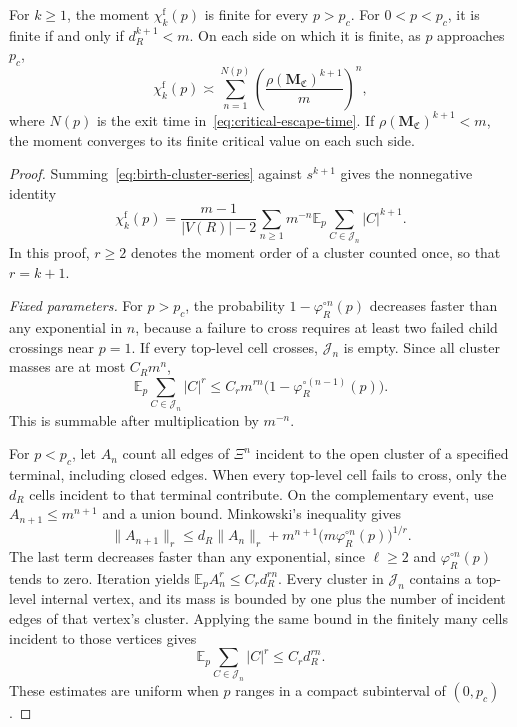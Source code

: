\begin{proposition}\label{prop:annealed-moments}
For $k\ge1$, the moment $\chi_k^{\mathrm f}(p)$ is finite for every $p>p_c$.
For $0<p<p_c$, it is finite if and only if $d_R^{k+1}<m$.
On each side on which it is finite, as $p$ approaches $p_c$,
\begin{equation}\label{eq:near-critical-moment-sum}
 \chi_k^{\mathrm f}(p)\asymp
 \sum_{n=1}^{N(p)}
 \left(\frac{\rho(\mathbf M_{\mathfrak C})^{k+1}}m\right)^n,
\end{equation}
where $N(p)$ is the exit time in~\eqref{eq:critical-escape-time}.
If $\rho(\mathbf M_{\mathfrak C})^{k+1}<m$, the moment converges to its finite critical value on each such side.
\end{proposition}
\begin{proof}
Summing~\eqref{eq:birth-cluster-series} against $s^{k+1}$ gives the nonnegative identity
\begin{equation}\label{eq:birth-moment-series}
 \chi_k^{\mathrm f}(p)=\frac{m-1}{|V(R)|-2}
 \sum_{n\ge1}m^{-n}\mathbb E_p
 \sum_{C\in\mathcal J_n}|C|^{k+1}.
\end{equation}
In this proof, $r\ge2$ denotes the moment order of a cluster counted once, so that $r=k+1$.

\emph{Fixed parameters.}
For $p>p_c$, the probability $1-\varphi_R^{\circ n}(p)$ decreases faster than any exponential in $n$, because a failure to cross requires at least two failed child crossings near $p=1$.
If every top-level cell crosses, $\mathcal J_n$ is empty.
Since all cluster masses are at most $C_Rm^n$,
\[
 \mathbb E_p\sum_{C\in\mathcal J_n}|C|^r
 \le C_rm^{rn}\bigl(1-\varphi_R^{\circ(n-1)}(p)\bigr).
\]
This is summable after multiplication by $m^{-n}$.

For $p<p_c$, let $A_n$ count all edges of $\Xi^n$ incident to the open cluster of a specified terminal, including closed edges.
When every top-level cell fails to cross, only the $d_R$ cells incident to that terminal contribute.
On the complementary event, use $A_{n+1}\le m^{n+1}$ and a union bound.
Minkowski's inequality gives
\[
 \|A_{n+1}\|_r\le d_R\|A_n\|_r
 +m^{n+1}\bigl(m\varphi_R^{\circ n}(p)\bigr)^{1/r}.
\]
The last term decreases faster than any exponential, since $\ell\ge2$ and $\varphi_R^{\circ n}(p)$ tends to zero.
Iteration yields $\mathbb E_p A_n^r\le C_rd_R^{rn}$.
Every cluster in $\mathcal J_n$ contains a top-level internal vertex, and its mass is bounded by one plus the number of incident edges of that vertex's cluster.
Applying the same bound in the finitely many cells incident to those vertices gives
\[
 \mathbb E_p\sum_{C\in\mathcal J_n}|C|^r\le C_rd_R^{rn}.
\]
These estimates are uniform when $p$ ranges in a compact subinterval of $(0,p_c)$.


\end{proof}
